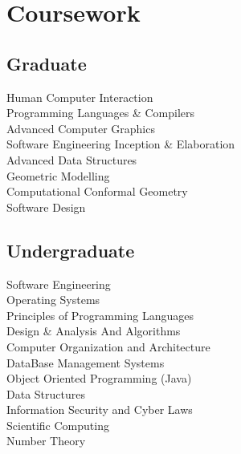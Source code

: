 \documentclass[hidelinks,letterpaper]{deedy-resume-openfont} %
\begin{document}
\begin{minipage}[t]{0.33\textwidth}
		\sectionsep
		
		\vspace{-0.25cm}
		\section{Coursework}
		
		\subsection{Graduate}
		Human Computer Interaction\\
		Programming Languages \& Compilers\\
		Advanced Computer Graphics\\
		Software Engineering Inception \&
		Elaboration\\
		Advanced Data Structures\\
		Geometric Modelling\\
		Computational Conformal Geometry\\
		Software Design\\
		
		\sectionsep
		
		
		\subsection{Undergraduate}
		
		Software Engineering \\
		Operating Systems \\
		Principles of Programming Languages\\
		Design \& Analysis And Algorithms \\
		Computer Organization and Architecture \\
		DataBase Management Systems\\
		Object Oriented Programming (Java)\\
		Data Structures\\
		Information Security and Cyber Laws\\
		Scientific Computing\\
		Number Theory\\
		\sectionsep
		
		

\end{minipage}
\end{document}
